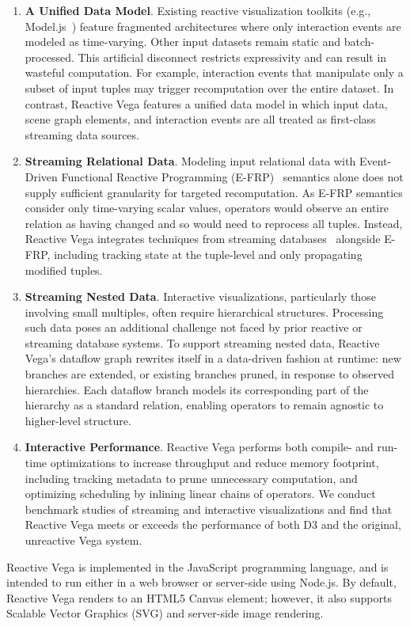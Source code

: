 \begin{enumerate}
  \item \textbf{A Unified Data Model}. Existing reactive visualization
toolkits (e.g., Model.js~\cite{kelleher:modeljs}) feature fragmented
architectures where only interaction events are modeled as time-varying. Other
input datasets remain static and batch-processed. This artificial disconnect
restricts expressivity and can result in wasteful computation. For example,
interaction events that manipulate only a subset of input tuples may trigger
recomputation over the entire dataset. In contrast, Reactive Vega features a
unified data model in which input data, scene graph elements, and interaction
events are all treated as first-class streaming data sources.

  \item \textbf{Streaming Relational Data}. Modeling input relational data with
Event-Driven Functional Reactive Programming (E-FRP)~\cite{wan:efrp} semantics
alone does not supply sufficient granularity for targeted recomputation. As
E-FRP semantics consider only time-varying scalar values, operators would
observe an entire relation as having changed and so would need to reprocess all
tuples. Instead, Reactive Vega integrates techniques from streaming
databases~\cite{abadi:borealis, abadi:aurora, arasu:stream, avnur:eddies,
chandrasekaran:telegraphcq} alongside E-FRP, including tracking state at the
tuple-level and only propagating modified tuples.

  \item \textbf{Streaming Nested Data}. Interactive visualizations, particularly
those involving small multiples, often require hierarchical structures.
Processing such data poses an additional challenge not faced by prior reactive
or streaming database systems. To support streaming nested data, Reactive Vega's
dataflow graph rewrites itself in a data-driven fashion at runtime: new branches
are extended, or existing branches pruned, in response to observed hierarchies.
Each dataflow branch models its corresponding part of the hierarchy as a
standard relation, enabling operators to remain agnostic to higher-level
structure.

  \item \textbf{Interactive Performance}. Reactive Vega performs both compile-
and run-time optimizations to increase throughput and reduce memory footprint,
including tracking metadata to prune unnecessary computation, and optimizing
scheduling by inlining linear chains of operators. We conduct benchmark
studies of streaming and interactive visualizations and find that Reactive
Vega meets or exceeds the performance of both D3 and the original, unreactive
Vega system.
\end{enumerate}

Reactive Vega is implemented in the JavaScript programming language, and is
intended to run either in a web browser or server-side using Node.js. By
default, Reactive Vega renders to an HTML5 Canvas element; however, it also
supports Scalable Vector Graphics (SVG) and server-side image rendering.




